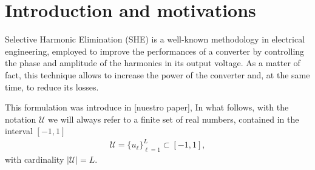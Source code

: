\section{Introduction and motivations}\label{Section1}

Selective Harmonic Elimination (SHE) \cite{Rodriguez2002} is a well-known methodology in electrical engineering, employed to improve the performances of a converter by controlling the phase and amplitude of the harmonics in its output voltage. As a matter of fact, this technique allows to increase the power of the converter and, at the same time, to reduce its losses. 
%


This formulation was introduce in [nuestro paper], In what follows, with the notation $\mathcal U$ we will always refer to a finite set of real numbers, contained in the interval $[-1,1]$
\begin{align}\label{eq:Udef}
	\mathcal U = \{u_\ell\}_{\ell=1}^L\subset [-1,1],
\end{align}
with cardinality $|\mathcal U| = L$. 


